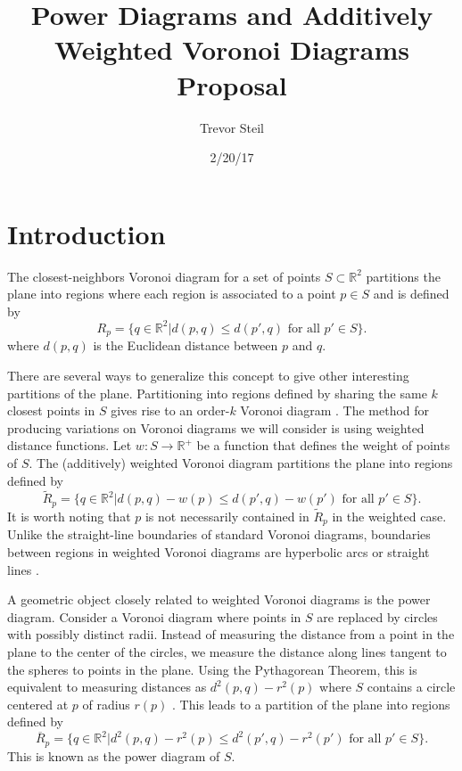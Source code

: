 \documentclass[a4paper]{article}
\title{Power Diagrams and Additively Weighted Voronoi Diagrams Proposal}
\date{2/20/17}
\author{Trevor Steil}
\newcommand{\R}{\mathbb{R}}
\begin{document}
\maketitle

\section{Introduction}

The closest-neighbors Voronoi diagram for a set of points $S \subset \R^2$ partitions the plane into regions where each region is associated to a
point $p \in S$ and is defined by
\begin{equation*}
  R_p = \{ q \in \R^2 | d(p,q) \leq d(p',q) \text{ for all } p' \in S \} .
\end{equation*}
where $d(p,q)$ is the Euclidean distance between $p$ and $q$.

There are several ways to generalize this concept to give other interesting partitions of the plane. Partitioning into regions defined by sharing the
same $k$ closest points in $S$ gives rise to an order-$k$ Voronoi diagram \cite{aurenhammer_survey}. The method for producing variations on
Voronoi diagrams we will consider is using weighted distance functions. Let $w: S \to \R^+$ be a function that defines the weight of points of $S$. The
(additively) weighted Voronoi diagram partitions the plane into regions defined by
\begin{equation*}
  \tilde{R}_p = \{ q \in \R^2 | d(p,q) - w(p) \leq d(p',q) - w(p') \text{ for all } p' \in S \}.
\end{equation*}
It is worth noting that $p$ is not necessarily contained in $\tilde{R}_p$ in the weighted case. Unlike the straight-line boundaries of standard
Voronoi diagrams, boundaries between regions in weighted Voronoi diagrams are hyperbolic arcs or straight lines \cite{aurenhammer_additive}.

A geometric object closely related to weighted Voronoi diagrams is the power diagram. Consider a Voronoi diagram where points in $S$ are replaced by
circles with possibly distinct radii. Instead of measuring the distance from a point in the plane to the center of the circles, we measure the distance
along lines tangent to the spheres to points in the plane. Using the Pythagorean Theorem, this is equivalent to measuring distances as $d^2(p,q) -
r^2(p)$ where $S$ contains a circle centered at $p$ of radius $r(p)$ \cite{aurenhammer_power}. This leads to a partition of the plane into regions defined by
\begin{equation*}
  \overline{R}_p = \{ q \in \R^2 | d^2(p,q) - r^2(p) \leq d^2(p',q) - r^2(p') \text{ for all } p' \in S \}.
\end{equation*}
This is known as the power diagram of $S$.
\end{document}
